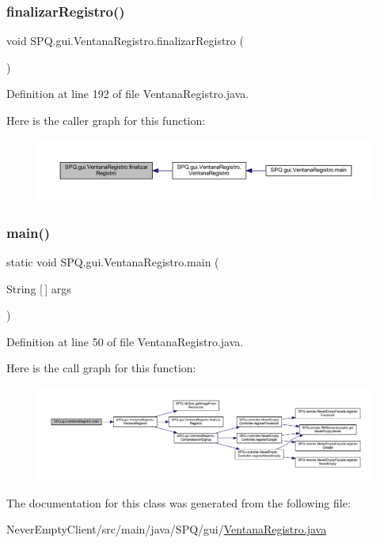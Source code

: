 \subsubsection{\texorpdfstring{finalizar\+Registro()}{finalizarRegistro()}}
{\footnotesize\ttfamily void S\+P\+Q.\+gui.\+Ventana\+Registro.\+finalizar\+Registro (\begin{DoxyParamCaption}{ }\end{DoxyParamCaption})}



Definition at line 192 of file Ventana\+Registro.\+java.

Here is the caller graph for this function\+:
\nopagebreak
\begin{figure}[H]
\begin{center}
\leavevmode
\includegraphics[width=350pt]{class_s_p_q_1_1gui_1_1_ventana_registro_ac33d30ad4e6980a453a3a6c3de20f468_icgraph}
\end{center}
\end{figure}
\mbox{\label{class_s_p_q_1_1gui_1_1_ventana_registro_a8d80a5efba104ecaefab065592e23a68}} 
\subsubsection{\texorpdfstring{main()}{main()}}
{\footnotesize\ttfamily static void S\+P\+Q.\+gui.\+Ventana\+Registro.\+main (\begin{DoxyParamCaption}\item[{String \mbox{[}$\,$\mbox{]}}]{args }\end{DoxyParamCaption})\hspace{0.3cm}{\ttfamily [static]}}



Definition at line 50 of file Ventana\+Registro.\+java.

Here is the call graph for this function\+:
\nopagebreak
\begin{figure}[H]
\begin{center}
\leavevmode
\includegraphics[width=350pt]{class_s_p_q_1_1gui_1_1_ventana_registro_a8d80a5efba104ecaefab065592e23a68_cgraph}
\end{center}
\end{figure}


The documentation for this class was generated from the following file\+:\begin{DoxyCompactItemize}
\item 
Never\+Empty\+Client/src/main/java/\+S\+P\+Q/gui/\mbox{\hyperlink{_ventana_registro_8java}{Ventana\+Registro.\+java}}\end{DoxyCompactItemize}
